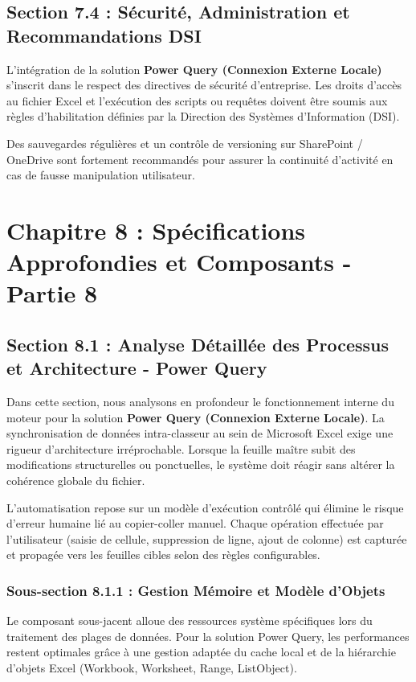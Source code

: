 \documentclass[12pt,a4paper]{report}
\begin{document}
\section{Section 7.4 : Sécurité, Administration et Recommandations DSI}
L'intégration de la solution \textbf{Power Query (Connexion Externe Locale)} s'inscrit dans le respect des directives de sécurité d'entreprise. Les droits d'accès au fichier Excel et l'exécution des scripts ou requêtes doivent être soumis aux règles d'habilitation définies par la Direction des Systèmes d'Information (DSI).

Des sauvegardes régulières et un contrôle de versioning sur SharePoint / OneDrive sont fortement recommandés pour assurer la continuité d'activité en cas de fausse manipulation utilisateur.


\chapter{Chapitre 8 : Spécifications Approfondies et Composants - Partie 8}

\section{Section 8.1 : Analyse Détaillée des Processus et Architecture - Power Query}
Dans cette section, nous analysons en profondeur le fonctionnement interne du moteur pour la solution \textbf{Power Query (Connexion Externe Locale)}. La synchronisation de données intra-classeur au sein de Microsoft Excel exige une rigueur d'architecture irréprochable. Lorsque la feuille maître subit des modifications structurelles ou ponctuelles, le système doit réagir sans altérer la cohérence globale du fichier.

L'automatisation repose sur un modèle d'exécution contrôlé qui élimine le risque d'erreur humaine lié au copier-coller manuel. Chaque opération effectuée par l'utilisateur (saisie de cellule, suppression de ligne, ajout de colonne) est capturée et propagée vers les feuilles cibles selon des règles configurables.


\subsection{Sous-section 8.1.1 : Gestion Mémoire et Modèle d'Objets}
Le composant sous-jacent alloue des ressources système spécifiques lors du traitement des plages de données. Pour la solution Power Query, les performances restent optimales grâce à une gestion adaptée du cache local et de la hiérarchie d'objets Excel (Workbook, Worksheet, Range, ListObject).
\end{document}
